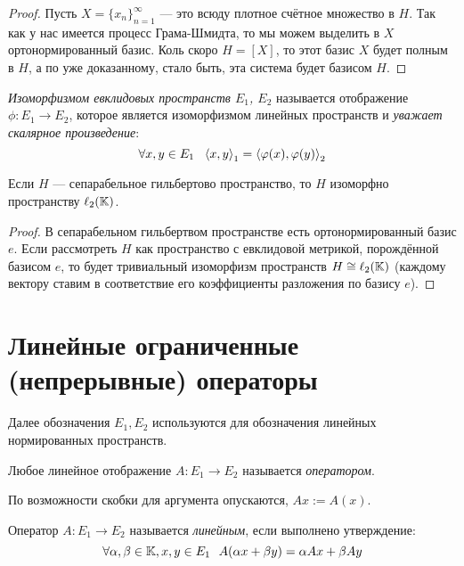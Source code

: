 \begin{proof}
	Пусть $X = \{x_n\}_{n = 1}^\infty$ --- это всюду плотное счётное множество в $H$. Так как у нас имеется процесс Грама-Шмидта, то мы можем выделить в $X$ ортонормированный базис. Коль скоро $H = [X]$, то этот базис $X$ будет полным в $H$, а по уже доказанному, стало быть, эта система будет базисом $H$.
\end{proof}

\begin{definition}
	\textit{Изоморфизмом евклидовых пространств $E_1$, $E_2$} называется отображение $\phi \colon E_1 \to E_2$, которое является изоморфизмом линейных пространств и \textit{уважает скалярное произведение}:
	\[
		\forall x, y \in E_1\ \ \left\langle x, y\right\rangle_1 = \left\langle\varphi(x), \varphi(y)\right\rangle_2
	\]
\end{definition}

\begin{theorem}
	Если $H$ --- сепарабельное гильбертово пространство, то $H$ изоморфно пространству $\ell_2(\mathbb{K})$.
\end{theorem}

\begin{proof}
	В сепарабельном гильбертвом пространстве есть ортонормированный базис $e$. Если рассмотреть $H$ как пространство с евклидовой метрикой, порождённой базисом $e$, то будет тривиальный изоморфизм пространств $H \cong \ell_2(\mathbb{K})$ (каждому вектору ставим в соответствие его коэффициенты разложения по базису $e$).
\end{proof}

\section{Линейные ограниченные (непрерывные) операторы}

\begin{note}
	Далее обозначения $E_1, E_2$ используются для обозначения линейных нормированных пространств.
\end{note}

\begin{definition}
	Любое линейное отображение $A \colon E_1 \to E_2$ называется \textit{оператором}.
\end{definition}

\begin{reminder}
	По возможности скобки для аргумента опускаются, $Ax := A(x)$.
\end{reminder}

\begin{definition}
	Оператор $A \colon E_1 \to E_2$ называется \textit{линейным}, если выполнено утверждение:
	\[
		\forall \alpha, \beta \in \K, x ,y \in E_1\ \ A(\alpha x + \beta y) = \alpha Ax + \beta Ay
	\]
\end{definition}

